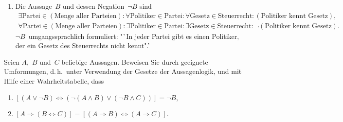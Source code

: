 \documentclass[a4paper]{article}
\begin{document}
    \begin{solution}\leavevmode
        \begin{enumerate}
            \begin{enumerate}
                \item[$A_1$] \emph{Aus~$A$ folgt nicht~$A_1$.} $A$~macht nur eine Aussage über den Fall, dass die Sonne scheint. Wir können auch aus einem anderen Grund baden gehen, z.\,B.\ wenn ein Freund Geburtstag hat. Dann muss aber nicht notwendigerweise die Sonne scheinen. \emph{Die Konversion (Umkehrung) gilt nicht immer.}
                \item[$A_2$] \emph{Aus~$A$ folgt nicht~$A_2$.} $A$~macht nur eine Aussage über den Fall, dass die Sonne scheint. Scheint die Sonne nicht, könnte alles passieren~-- wir könnten trotzdem baden gehen. \emph{Eine Implikation ist eine Äquivalenz.}
                \item[$A_3$] \emph{Aus~$A$ folgt~$A_3$.} Würde nämlich die Sonne scheinen, so gehen wir nach~$A$ baden, was aber der Voraussetzung widerspricht. \emph{Implikation und Kontraposition sind (tautologisch) äquivalent.}
            \end{enumerate}
            \item Die Aussage~$B$ und dessen Negation~$\neg B$ sind
                  \begin{gather*}
                      \exists\text{Partei}\in(\text{Menge aller Parteien})\colon \forall\text{Politiker}\in\text{Partei}\colon \forall\text{Gesetz}\in\text{Steuerrecht}\colon (\text{Politiker kennt Gesetz}), \\
                      \forall\text{Partei}\in(\text{Menge aller Parteien})\colon \exists\text{Politiker}\in\text{Partei}\colon \exists\text{Gesetz}\in\text{Steuerrecht}\colon \neg(\text{Politiker kennt Gesetz}).
                  \end{gather*}
                  $\neg B$~umgangssprachlich formuliert: "`In jeder Partei gibt es einen Politiker, der ein Gesetz des Steuerrechts nicht kennt".'
        \end{enumerate}
    \end{solution}

    \begin{problem}[B01.A2]
    Seien $A$,~$B$ und~$C$ beliebige Aussagen. Beweisen Sie durch geeignete Umformungen, d.\,h.\ unter Verwendung der Gesetze der Aussagenlogik, und mit Hilfe einer Wahrheitstabelle, dass
    \begin{enumerate}
        \item $[(A \vee \neg B) \Leftrightarrow (\neg(A \wedge B) \vee (\neg B \wedge C))] = \neg B$,
        \item $[A \Rightarrow (B \Leftrightarrow C)] = [(A \Rightarrow B) \Leftrightarrow (A \Rightarrow C)]$.
    \end{enumerate}
    \end{problem}
\end{document}
